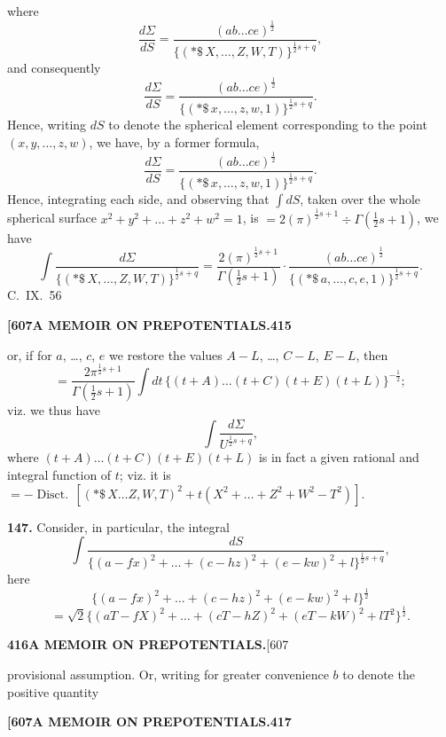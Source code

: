 \documentclass[11pt,a4paper]{book}
\begin{document}
{where
\[
\frac{d\Sigma}{dS} = \frac{(ab\ldots ce)^{\frac{1}{2}}}{\{(*\!\!\$\, X, \ldots, Z, W, T)\}^{\frac{1}{2}s+q}},
\]
and consequently
\[
\frac{d\Sigma}{dS} = \frac{(ab\ldots ce)^{\frac{1}{2}}}{\{(*\!\!\$\, x, \ldots, z, w, 1)\}^{\frac{1}{2}s+q}}.
\]
Hence, writing $dS$ to denote the spherical element corresponding to the point $(x, y, \ldots, z, w)$, we have, by a former formula,
\[
\frac{d\Sigma}{dS} = \frac{(ab\ldots ce)^{\frac{1}{2}}}{\{(*\!\!\$\, x, \ldots, z, w, 1)\}^{\frac{1}{2}s+q}}.
\]
Hence, integrating each side, and observing that $\int dS$, taken over the whole spherical surface $x^2 + y^2 + \ldots + z^2 + w^2 = 1$, is $= 2(\pi)^{\frac{1}{2}s+1} \div \Gamma(\frac{1}{2}s+1)$, we have
\[
\int \frac{d\Sigma}{\{(*\!\!\$\, X, \ldots, Z, W, T)\}^{\frac{1}{2}s+q}} = \frac{2(\pi)^{\frac{1}{2}s+1}}{\Gamma(\frac{1}{2}s+1)} \cdot \frac{(ab\ldots ce)^{\frac{1}{2}}}{\{(*\!\!\$\, a, \ldots, c, e, 1)\}^{\frac{1}{2}s+q}}.
\]
\hfill C.~IX.\ 56

\newpage
\noindent\textbf{[607}\hspace{\fill}\textbf{A MEMOIR ON PREPOTENTIALS.}\hspace{\fill}\textbf{415}

or, if for $a$, \ldots, $c$, $e$ we restore the values $A-L$, \ldots, $C-L$, $E-L$, then
\[
= \frac{2\pi^{\frac{1}{2}s+1}}{\Gamma(\frac{1}{2}s+1)} \int dt\, \{(t+A)\ldots(t+C)(t+E)(t+L)\}^{-\frac{1}{2}};
\]
viz. we thus have
\[
\int \frac{d\Sigma}{U^{\frac{1}{2}s+q}},
\]
where $(t+A)\ldots(t+C)(t+E)(t+L)$ is in fact a given rational and integral function of $t$; viz. it is $= -\operatorname{Disct.}\, [(*\!\!\$\, X\ldots Z, W, T)^2 + t(X^2 + \ldots + Z^2 + W^2 - T^2)]$.

\medskip
\noindent\textbf{147.}
Consider, in particular, the integral
\[
\int \frac{dS}{\{(a-fx)^2 + \ldots + (c-hz)^2 + (e-kw)^2 + l\}^{\frac{1}{2}s+q}},
\]
here
\[
\{(a-fx)^2 + \ldots + (c-hz)^2 + (e-kw)^2 + l\}^{\frac{1}{2}}
\]
\[
= \sqrt{2}\{(aT-fX)^2 + \ldots + (cT-hZ)^2 + (eT-kW)^2 + lT^2\}^{\frac{1}{2}}.
\]

\newpage
\noindent\textbf{416}\hspace{\fill}\textbf{A MEMOIR ON PREPOTENTIALS.}\hspace{\fill}[607

provisional assumption. Or, writing for greater convenience $b$ to denote the positive quantity

\newpage
\noindent\textbf{[607}\hspace{\fill}\textbf{A MEMOIR ON PREPOTENTIALS.}\hspace{\fill}\textbf{417}

}
\end{document}
